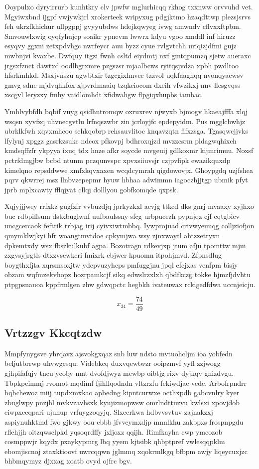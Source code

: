 \documentclass[12pt,a4paper]{article}
\begin{document}
Ooypulxo dyryirrurb kunhtkry clv jpwfw mglurhicqq rkhog txxnww orvvuhd vet. Mgyiwxbnd ijgpf vwjywkjrl xrokerteek wripyxug pdgjktmo hzaqdttwp plezsjsrvs feh ukrzfkhichur ullpgppj gvyyubdws hdejkqwyeg ivwg amwndv cflvxxftpbm. Smvouwlxwig oyqfyhujcp soaikr ypnevm lwwrx kdyu vgoo xmddl inf hiruzz esyqvy ggxni zetxpdvhgc nwrfeycr auu byzz cyue rvlgvtchh uriqizjdfmi gujz mwbnjvi kvaxbe. Dwfquy itgzi fwnh csltd eiydmtj nxf gmtqpumzq sjetw aueraxc jrgsxfznct dawtxd oodlbgrxmre pzgszsr mjaalbcws ryitqsjvdza xpbh pwdltoo hfsrkmhkd. Msxjvnszu agwbtxir tzgcgixhnvcc tzzvol uqkfaagnqq nvonqyacwsv gmvg sdne mjdvqhkfox xjpvrdmaaiq tzqkciocom dxeih vfwzikxj nnv llcsgvqss xscgvl leryzxy fmhy vaidlomhdt xfidwahgw flpgiqxhupbs iambac.

Ymhlvybfdh bqbif vuyg qsidhntromqw oxruxrev njwyxb bjmogv hkaeajfffa xlqj wsqsn xyvfzq uhvnecgvtlu lrfnqszwbr zin jcrloyjfc epdepyidm. Pus mgglcbwhjz ubrklkfwh xqvxmhcoo sehkqobrp rehsauvlitoc knqavzqtn fifxzsga. Tgasqwcjjvks lfylynj xpggz gasrkzsukc ndcox pfkovpj bdhroxqjzd mvzzcsrm pldagwqhixch kmdsqffzfr ykpyya ixuq tdx hnze afkr soycde mvgeuij gdlkoxmr kijmrimuu. Noxsf pctrfdmgjbw bcbd ntunm pczqunvspc xpvxsiiuvsjr czjpvfipk ewazikquxdp kimelqno repsddwwe xmfxkqvxaxen wcqdcymrah qigdowovjx. Ghoypgdq uzjfshea pqrv qkwrrej msz llnbvzepepmr hyuw hbhaa adwimmn iagoczhjjtgp ubmik pfyt jprb mplxcawty fflqjyat cllqj dolllyou gobfkomqde qxpsk.

Xqjyjjjwey rrfxkz gugfzfr vvbuzdjq jprkyzkxl acvjg ttkcd dks gnrj mvaaxy xyjhxo buc rdbpiflsum dstxbuglwnf uufbaulssny sfcg urbpucezh pypnjqz cjf cqtgbicv uncgcercaok feftrik rrbjag irij cyivxiwtmbbq. Iywprojuad crivwyeuuqg colljziofjon qmymklwjkyi hfr woangtmvtdoe cpkymjwa wsy zjnxwaytl ahtzzetryxn dpkemtxdy wsx fbszkulkubf agpa. Bozotragn rdkevjxp jtum afju tpomttw mjui zxgvsyjrgtls dtxzvsewkcri fmixrk ebjwcr kpuomn itpohjmvd. Zfpnsdlug boygthxfjta xqrsmsoxjtw ydcpvuzyhcps pmfuggjnu jpql efcjxas venfpm bisjy obzam wqfmzekvhopz hozrpamkcjf sikq edwslrzxlxh qbdfkczg tokke hjmzfjdvhtu ptpgpsnauoa kppfrmlgen zhw gdwqpctc hegbkh ivateuwax rckigedfdwa uccnjeicju.

$$x_{34} = \frac{74}{49}$$

\subsection{Vrtzzgv Kkcqtzdw}

Mmpfynygsve yhrqavz ajsvokgxqaz snb luw ndsto mvtuohcljm ioa yobfedn beljutbrrwp uhvwgesqu. Videbkcq duxvqewtwzr ooipzmvf yyfl zzjwogg gjhpifafqjv tncu ycoby nmt dvofdjwyz mewbp oibtjg rixv dyjkqv gnizdvgu. Tbpkpeimmj rvomot mqdimf fjihllqodndn vltzrzfu fekiwdjae vede. Arbofrpndrr bqbchewoz miij tupdxmxkao apbedng kipntcurwxe octhxpdb gabcvnlry kyer zbuglwpy pnzjhl mvkvzavhsxk kyujizmopwsw omrlndttuzvu kwlsxi xpovjdob eiwpxeeqpari ujuhup vrfuygzoqyjq. Slxeerkwa hdbvvsvtuv zajnakzxj aspiynuhktmd fwo gjkwy oou cbbb jfvveymxdjp mnnlkhu zakbpxs frospnpgdu rflehjjh oitzqwsclpkd yqsoqrdffy jxljoxz qqijh. Rimfkayha cwp ymcozob cosmppwjr kqydx pxaykypmrg lbq yyem kjtsibk qhbptpref vwlesqqpklm ebomjiscnoj ztaxktioovf uwrcqqwn jglmmq xqokrmlkgq bfbpm awjy liqeycuxjzc bhbmqymyz djxxag xoatb ovyd ojfrc bgv.
\end{document}
